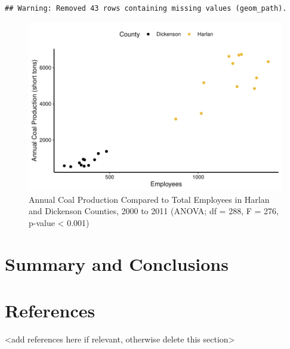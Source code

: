\documentclass[12pt,]{article}
\begin{document}
\begin{verbatim}
## Warning: Removed 43 rows containing missing values (geom_path).
\end{verbatim}

\begin{figure}
\centering
\includegraphics{Smith_ENV872_Project_files/figure-latex/unnamed-chunk-9-1.pdf}
\caption{\label{fig:figs} Annual Coal Production Compared to Total
Employees in Harlan and Dickenson Counties, 2000 to 2011 (ANOVA; df =
288, F = 276, p-value \textless{} 0.001)}
\end{figure}

\newpage

\newpage

\hypertarget{summary-and-conclusions}{%
\section{Summary and Conclusions}\label{summary-and-conclusions}}

\newpage

\hypertarget{references}{%
\section{References}\label{references}}

\textless{}add references here if relevant, otherwise delete this
section\textgreater{}
\end{document}
